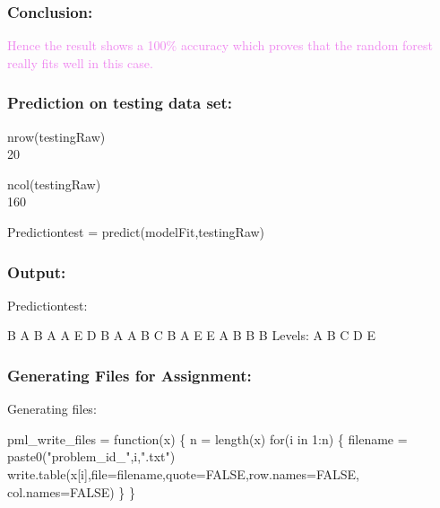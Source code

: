 \documentclass{beamer}
\begin{document}

\begin{frame}[fragile]
\frametitle{Conclusion:}
\begin{alertblock}
{\textcolor{violet}{Hence the result shows a 100\% accuracy which proves 
that the random forest really fits well in this case.}}
\end{alertblock}
\end{frame}



\begin{frame}[fragile]
\frametitle{Prediction on testing data set:}
\begin{itemize}
\begin{tcolorbox}
\item nrow(testingRaw)\\
20\\
\item ncol(testingRaw)\\
160\\
\item Predictiontest = predict(modelFit,testingRaw)

\end{tcolorbox}
\end{itemize}
\end{frame}



\begin{frame}[fragile]
\frametitle{Output:}
\begin{block}{Predictiontest:}\newline

B   A   B   A   A   E   D   B   A   A   B   C   B   A   E   E   A   
B   B   B\newline
Levels:  A   B   C   D   E

\end{block}
\end{frame}



\begin{frame}[fragile]
\frametitle{Generating Files for Assignment:}
\begin{block}{Generating files:}\newline

pml\_write\_files = function(x) \{\newline
n = length(x)\newline
for(i in 1:n) \{\newline
filename = paste0("problem\_id\_",i,".txt")\newline
write.table(x[i],file=filename,quote=FALSE,row.names=FALSE,
col.names=FALSE)\newline
\}\newline
\}

\end{block}
\end{frame}
\end{document}

